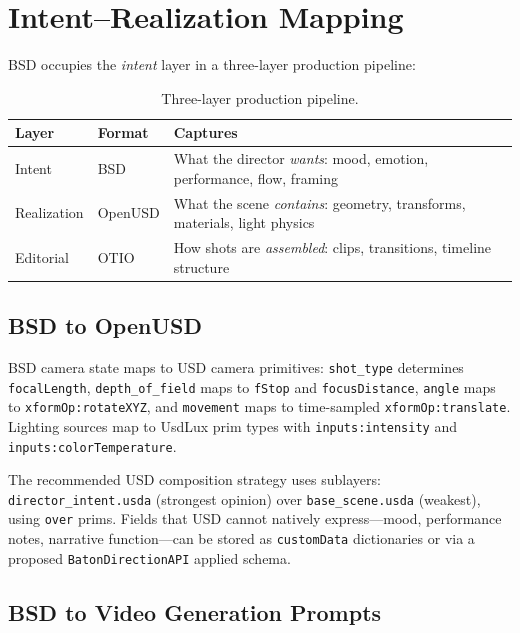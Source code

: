 \documentclass{article}
\begin{document}
\section{Intent--Realization Mapping}\label{sec:mapping}

BSD occupies the \emph{intent} layer in a three-layer production pipeline:

\begin{table}[H]
\centering
\begin{tabular}{@{}lll@{}}
\toprule
\textbf{Layer} & \textbf{Format} & \textbf{Captures} \\
\midrule
Intent & BSD & What the director \emph{wants}: mood, emotion, performance, flow, framing \\
Realization & OpenUSD & What the scene \emph{contains}: geometry, transforms, materials, light physics \\
Editorial & OTIO & How shots are \emph{assembled}: clips, transitions, timeline structure \\
\bottomrule
\end{tabular}
\caption{Three-layer production pipeline.}
\label{tab:layers}
\end{table}

\subsection{BSD to OpenUSD}

BSD camera state maps to USD camera primitives: \texttt{shot\_type} determines \texttt{focalLength}, \texttt{depth\_of\_field} maps to \texttt{fStop} and \texttt{focusDistance}, \texttt{angle} maps to \texttt{xformOp:rotateXYZ}, and \texttt{movement} maps to time-sampled \texttt{xformOp:translate}. Lighting sources map to UsdLux prim types with \texttt{inputs:intensity} and \texttt{inputs:colorTemperature}.

The recommended USD composition strategy uses sublayers: \texttt{director\_intent.usda} (strongest opinion) over \texttt{base\_scene.usda} (weakest), using \texttt{over} prims. Fields that USD cannot natively express---mood, performance notes, narrative function---can be stored as \texttt{customData} dictionaries or via a proposed \texttt{BatonDirectionAPI} applied schema.

\subsection{BSD to Video Generation Prompts}
\end{document}
